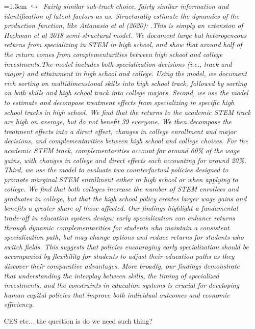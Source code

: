 \documentclass[11pt]{article}
\newcommand{\note}[1]{\par\smallskip\noindent\hangindent=1.3em
  \textcolor{notecol}{\footnotesize$\hookrightarrow$~\textit{#1}}}
\begin{document}
\note{Fairly similar sub-track choice, fairly similar information and identification of latent factors as us. Structurally estimate the dynamics of the production function, like Attanasio et al (2020): .This is simply an extension of Heckman et al 2018 semi-structural model. We document large but heterogeneous returns from specializing in STEM in high school, and show that around half of the return comes from complementarities between high school and college investments.The model includes both specialization decisions (i.e., track and major) and attainment in high school and college. Using the model, we document rich sorting on multidimensional skills into high school track, followed by sorting on both skills and high school track into college majors. Second, we use the model to estimate and decompose treatment effects from specializing in specific high school tracks in high school. We find that the returns to the academic STEM track are high on average, but do not benefit  39 everyone. We then decompose the treatment effects into a direct effect, changes in college enrollment and major decisions, and complementarities between high school and college choices. For the academic STEM track, complementarities account for around 60\% of the wage gains, with changes in college and direct effects each accounting for around 20\%. Third, we use the model to evaluate two counterfactual policies designed to promote marginal STEM enrollment either in high school or when applying to college. We find that both colleges increase the number of STEM enrollees and graduates in college, but that the high school policy creates larger wage gains and benefits a greater share of those affected.  Our findings highlight a fundamental trade-off in education system design: early specialization can enhance returns through dynamic complementarities for students who maintain a consistent specialization path, but may change options and reduce returns for students who switch fields. This suggests that policies encouraging early specialization should be accompanied by flexibility for students to adjust their education paths as they discover their comparative advantages. More broadly, our findings demonstrate that understanding the interplay between skills, the timing of specialized investments, and the constraints in education systems is crucial for developing human capital policies that improve both individual outcomes and economic efficiency.}

CES etc... the question is do we need such thing?
\end{document}

